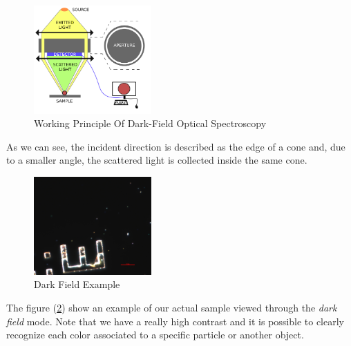 \documentclass{article}
\numberwithin{equation}{section}
\begin{document}
\begin{figure}[h!]
    \centering
    \includegraphics[width=0.4\textwidth, height=0.37\textwidth]{dark_field_working.png}
    \caption{Working Principle Of Dark-Field Optical Spectroscopy}
    \label{fig:dark_field_working}
\end{figure}
As we can see, the incident direction is described as the edge of a cone and, due to a smaller angle, the scattered light is collected inside the same cone.
\begin{figure}[h!]
    \centering
    \includegraphics[width=0.4\textwidth, height=0.35\textwidth]{dark_field_ex.png}
    \caption{Dark Field Example}
    \label{fig:dark_field_ex}
\end{figure}
The figure (\ref{fig:dark_field_ex}) show an example of our actual sample viewed through the \textit{dark field} mode. Note that we have a really high contrast and it is possible to clearly recognize each color associated to a specific particle or another object.
\end{document}
